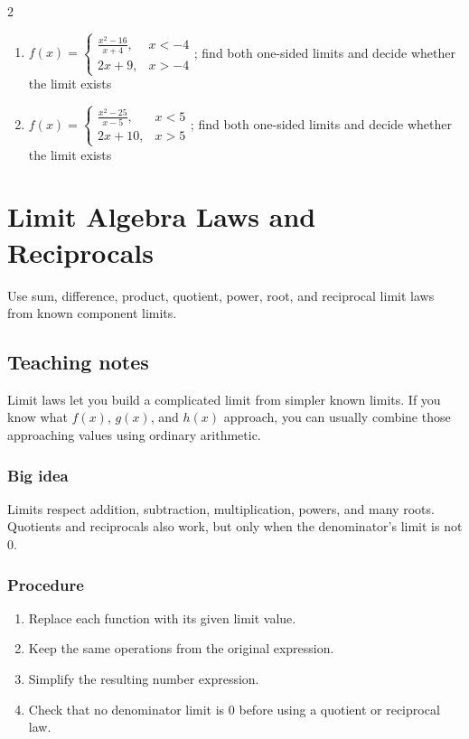 \documentclass[11pt,oneside]{book}
\newenvironment{rulebox}[1]{\par\medskip\noindent{\color{navy}\bfseries #1}\par\noindent{\color{navy}\hrule}\smallskip}{\par\smallskip\noindent{\color{navy}\hrule}\par\medskip}
\begin{document}
\begin{multicols}{2}
\begin{enumerate}[leftmargin=*,label=\textbf{\arabic*.},itemsep=0.65\baselineskip]
\item $f(x)=\begin{cases} \frac{x^{2} - 16}{x + 4}, & x<-4\\ 2 x + 9, & x>-4 \end{cases}$; find both one-sided limits and decide whether the limit exists
\item $f(x)=\begin{cases} \frac{x^{2} - 25}{x - 5}, & x<5\\ 2 x + 10, & x>5 \end{cases}$; find both one-sided limits and decide whether the limit exists
\end{enumerate}
\end{multicols}

\chapter{Limit Algebra Laws and Reciprocals}
\begin{rulebox}{Learning target}
Use sum, difference, product, quotient, power, root, and reciprocal limit laws from known component limits.
\end{rulebox}
\section*{Teaching notes}
Limit laws let you build a complicated limit from simpler known limits. If you know what $f(x)$, $g(x)$, and $h(x)$ approach, you can usually combine those approaching values using ordinary arithmetic.

\subsection*{Big idea}
Limits respect addition, subtraction, multiplication, powers, and many roots. Quotients and reciprocals also work, but only when the denominator's limit is not $0$.

\subsection*{Procedure}
\begin{enumerate}[leftmargin=*]
\item Replace each function with its given limit value.
\item Keep the same operations from the original expression.
\item Simplify the resulting number expression.
\item Check that no denominator limit is $0$ before using a quotient or reciprocal law.
\end{enumerate}
\end{document}

